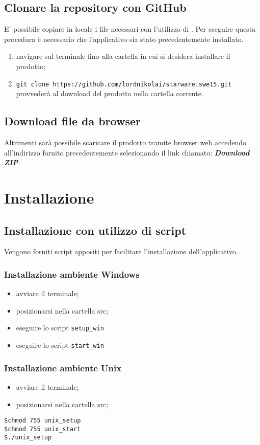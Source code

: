 \documentclass[12pt,a4paper]{article}
\begin{document}
	\subsection{Clonare la repository con GitHub}
	E' possibile copiare in locale i file necessari con l'utilizzo di . 
	Per eseguire questa procedura è necessario che l'applicativo  sia stato precedentemente installato.
	\begin{enumerate}
		\item navigare sul terminale fino alla cartella in cui si desidera installare il prodotto;
		\item \texttt{git clone https://github.com/lordnikolai/starware.swe15.git} provvederà al download del prodotto nella cartella corrente. 
	\end{enumerate}
	
	\subsection{Download file da browser}
	Altrimenti sarà possibile scaricare il prodotto tramite browser web accedendo
	all’indirizzo fornito precedentemente selezionando il link chiamato: \textbf{\textit{Download ZIP}}.
	
	\section{Installazione}\label{install}
	\subsection{Installazione con utilizzo di script}
	Vengono forniti script appositi per facilitare l'installazione dell'applicativo. 
	
		\subsubsection{Installazione ambiente Windows}
		\begin{itemize}
			\item avviare il terminale;
			\item posizionarsi nella cartella src;
			\item eseguire lo script \texttt{setup\_win}
			\item eseguire lo script \texttt{start\_win}	
		\end{itemize}	
	
		\subsubsection{Installazione ambiente Unix}
		\begin{itemize}
			\item avviare il terminale;
			\item posizionarsi nella cartella src;
		
		\end{itemize}
			\begin{center}
				\texttt{\$chmod 755 unix\_setup \\
					\$chmod 755 unix\_start	 \\
					\$./unix\_setup }
					
			\end{center}
\end{document}
